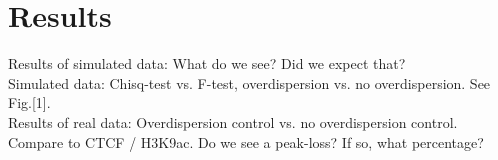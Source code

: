 \section{Results}

Results of simulated data: What do we see? Did we expect that?\\
Simulated data: Chisq-test vs. F-test, overdispersion vs. no overdispersion. See Fig.[1].\\
Results of real data: Overdispersion control vs. no overdispersion control.\\
Compare to CTCF / H3K9ac. Do we see a peak-loss? If so, what percentage?
  
  
